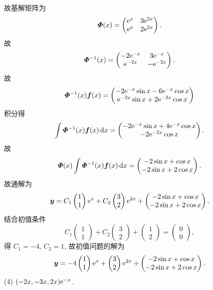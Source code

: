 \begin{solve}
  故基解矩阵为
  \[\bm{\varPhi}(x)=\begin{pmatrix}\mathrm{e}^x&3\mathrm{e}^{2x}\\\mathrm{e}^x&2\mathrm{e}^{2x}\end{pmatrix}.\]
  故
  \[\bm{\varPhi}^{-1}(x)=\begin{pmatrix}-2\mathrm{e}^{-x}&3\mathrm{e}^{-x}\\\mathrm{e}^{-2x}&-\mathrm{e}^{-2x}\end{pmatrix}.\]
  故
  \[\bm{\varPhi}^{-1}(x)\bm{f}(x) =
    \begin{pmatrix}-2\mathrm{e}^{-x}\sin x-6\mathrm{e}^{-x}\cos x\\\mathrm{e}^{-2x}\sin x+2\mathrm{e}^{-2x}\cos x\end{pmatrix}\]
  积分得
  \[\int\bm{\varPhi}^{-1}(x)\bm{f}(x)\mathop{}\!\mathrm{d} x =
    \begin{pmatrix}-2\mathrm{e}^{-x}\sin x+4\mathrm{e}^{-x}\cos x\\-2\mathrm{e}^{-2x}\cos x\end{pmatrix}.\]
  故
  \[\bm{\varPhi}(x)\int\bm{\varPhi}^{-1}(x)\bm{f}(x)\mathop{}\!\mathrm{d} x =
    \begin{pmatrix}-2\sin x+\cos x\\-2\sin x+2\cos x\end{pmatrix}.\]
  故通解为
  \[\bm{y} = C_1\begin{pmatrix}1\\1\end{pmatrix}\mathrm{e}^x
    + C_2\begin{pmatrix}3\\2\end{pmatrix}\mathrm{e}^{2x}
    + \begin{pmatrix}-2\sin x+\cos x\\-2\sin x+2\cos x\end{pmatrix}.\]
  结合初值条件
  \[C_1\begin{pmatrix}1\\1\end{pmatrix}
    + C_2\begin{pmatrix}3\\2\end{pmatrix}
    + \begin{pmatrix}1\\2\end{pmatrix}
    = \begin{pmatrix}0\\0\end{pmatrix},\]
  得 $C_1=-4$, $C_2=1$, 故初值问题的解为
  \[\bm{y} =
    - 4\begin{pmatrix}1\\1\end{pmatrix}\mathrm{e}^x
    + \begin{pmatrix}3\\2\end{pmatrix}\mathrm{e}^{2x}
    + \begin{pmatrix}-2\sin x+\cos x\\-2\sin x+2\cos x\end{pmatrix}.\]
  (4) $(-2x,-3x,2x)\mathrm{e}^{-x}$.
\end{solve}



